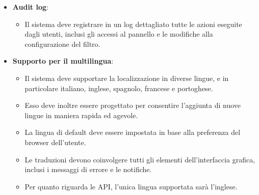 \begin{itemize}
  \item \textbf{Audit log}:
    \begin{itemize}
      \item Il sistema deve registrare in un log dettagliato tutte le azioni eseguite dagli utenti, inclusi gli accessi al pannello e le modifiche alla configurazione del filtro.
    \end{itemize}

  \item \textbf{Supporto per il multilingua}:
    \begin{itemize}
      \item Il sistema deve supportare la localizzazione in diverse lingue, e in particolare italiano, inglese, spagnolo, francese e portoghese.
      \item Esso deve inoltre essere progettato per consentire l’aggiunta di nuove lingue in maniera rapida ed agevole.
      \item La lingua di default deve essere impostata in base alla preferenza del browser dell’utente.
      \item Le traduzioni devono coinvolgere tutti gli elementi dell’interfaccia grafica, inclusi i messaggi di errore e le notifiche.
      \item Per quanto riguarda le API, l'unica lingua supportata sarà l'inglese.
    \end{itemize}
\end{itemize}

